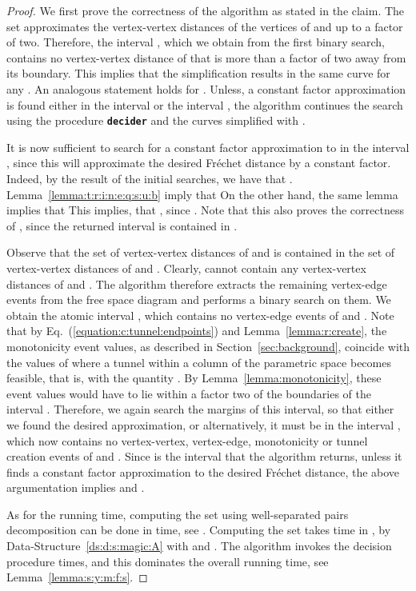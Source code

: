 \documentclass[12pt]{article}
\makeatletter
\newcommand{\AlgorithmI}[1]{{\textcolor[named]{RedViolet}{\texttt{\bf{#1}}}}}
\newcommand{\Algorithm}[1]{{\AlgorithmI{#1}\index{algorithm!#1@{\AlgorithmI{#1}}}}}
\newcommand{\secref}[1]{Section~\ref{sec:#1}}
\newcommand{\lemref}[1]{Lemma~\ref{lemma:#1}}
\newcommand{\Eqrefpage}[1]{Eq.~(\ref{equation:#1})}
\newcommand{\dsref}[1]{Data-Structure~\ref{ds:#1}}
\newcommand{\Frechet}{Fr\'{e}c{h}e{}t\xspace}\providecommand{\Arr}{\mathop{\mathrm{\EuScript{A}}}}
\newcommand{\deciderFr}{\Algorithm{decider}\xspace}
\numberwithin{figure}{section}
\numberwithin{equation}{section}
\makeatother
\begin{document}
\begin{proof}
    We first prove the correctness of the algorithm as stated in the
    claim.  The set  approximates the vertex-vertex distances of
    the vertices of  and  up to a factor of
    two. Therefore, the interval , which we
    obtain from the first binary search, contains no vertex-vertex
    distance of  that is more than a factor of two away from
    its boundary.  This implies that the simplification
     results in the same curve for any
    .  An analogous statement holds for
    . Unless, a constant factor approximation is found either
    in the interval  or the interval , the algorithm continues the search using the procedure
    \deciderFr and the curves simplified with .
    
    
    It is now sufficient to search for a constant factor approximation
    to  in the interval
    , since this will approximate the
    desired \Frechet distance by a constant factor.  Indeed, by the
    result of the initial searches, we have that .  \lemref{t:r:i:n:e:q:s:u:b}
    imply that  On the other hand, the
    same lemma implies that  This implies, that
    , since
    .  Note that
    this also proves the correctness of , since the returned
    interval is contained in .
    
    Observe that the set of vertex-vertex distances of  and 
    is contained in the set of vertex-vertex distances of 
    and . Clearly,  cannot contain any
    vertex-vertex distances of  and .  The algorithm
    therefore extracts the remaining vertex-edge events  from the
    free space diagram and performs a binary search on them.  We
    obtain the atomic interval , which
    contains no vertex-edge events of  and
    . Note that by \Eqrefpage{c:tunnel:endpoints} and \lemref{r:create},
    the monotonicity event values, as described in
    \secref{background}, coincide with the values of  where a
    tunnel within a column of the parametric space becomes feasible,
    that is, with the quantity .  By
    \lemref{monotonicity}, these event values would have to lie within
    a factor two of the boundaries of the interval .
    Therefore, we again search the margins of this interval, so that
    either we found the desired approximation, or alternatively, it
    must be in the interval ,
    which now contains no vertex-vertex, vertex-edge, monotonicity or
    tunnel creation events of  and .  Since 
    is the interval that the algorithm returns, unless it finds a
    constant factor approximation to the desired \Frechet distance,
    the above argumentation implies  and .
    
    As for the running time, computing the set  using
    well-separated pairs decomposition can be done in 
    time, see \cite{dhw-afdrc-12}.  Computing the set  takes time
    in , by \dsref{d:s:magic:A} with
     and .  The algorithm invokes the
    decision procedure  times, and this dominates the
    overall running time, see \lemref{s:y:m:f:s}.
\end{proof}
\end{document}
